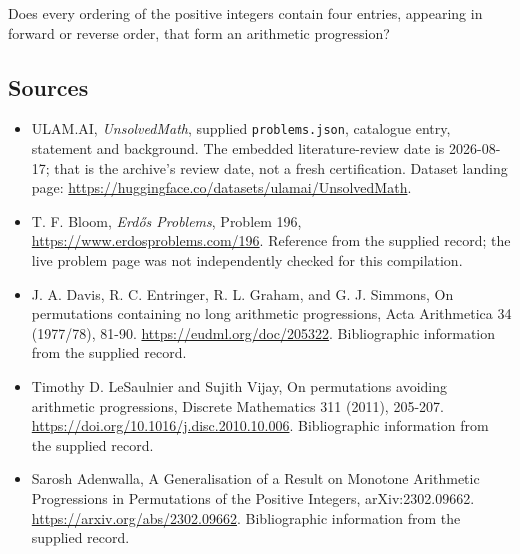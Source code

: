 \documentclass[11pt,a4paper]{article}
\begin{document}
Does every ordering of the positive integers contain four entries, appearing in forward or reverse order, that form an arithmetic progression?

\subsection{Sources}

{\small

\begin{itemize}

\item[\hypertarget{source:statement:1}{S1}] ULAM.AI, \emph{UnsolvedMath}, supplied \texttt{problems.json}, catalogue entry, statement and background. The embedded literature-review date is 2026-08-17; that is the archive’s review date, not a fresh certification. Dataset landing page: \url{https://huggingface.co/datasets/ulamai/UnsolvedMath}.

\item[\hypertarget{source:statement:2}{S2}] T. F. Bloom, \emph{Erdős Problems}, Problem 196, \url{https://www.erdosproblems.com/196}. Reference from the supplied record; the live problem page was not independently checked for this compilation.

\item[\hypertarget{source:statement:3}{S3}] J. A. Davis, R. C. Entringer, R. L. Graham, and G. J. Simmons, On permutations containing no long arithmetic progressions, Acta Arithmetica 34 (1977/78), 81-90. \url{https://eudml.org/doc/205322}. Bibliographic information from the supplied record.

\item[\hypertarget{source:statement:4}{S4}] Timothy D. LeSaulnier and Sujith Vijay, On permutations avoiding arithmetic progressions, Discrete Mathematics 311 (2011), 205-207. \url{https://doi.org/10.1016/j.disc.2010.10.006}. Bibliographic information from the supplied record.

\item[\hypertarget{source:statement:5}{S5}] Sarosh Adenwalla, A Generalisation of a Result on Monotone Arithmetic Progressions in Permutations of the Positive Integers, arXiv:2302.09662. \url{https://arxiv.org/abs/2302.09662}. Bibliographic information from the supplied record.

\end{itemize}

}

\label{end:statement}
\end{document}
